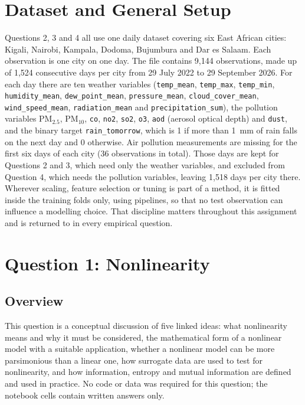 \documentclass[conference]{IEEEtran}
\begin{document}
\section{Dataset and General Setup}
Questions 2, 3 and 4 all use one daily dataset covering six East African cities: Kigali, Nairobi, Kampala, Dodoma, Bujumbura and Dar es Salaam. Each observation is one city on one day. The file contains 9{,}144 observations, made up of 1{,}524 consecutive days per city from 29 July 2022 to 29 September 2026. For each day there are ten weather variables (\texttt{temp\_mean}, \texttt{temp\_max}, \texttt{temp\_min}, \texttt{humidity\_mean}, \texttt{dew\_point\_mean}, \texttt{pressure\_mean}, \texttt{cloud\_cover\_mean}, \texttt{wind\_speed\_mean}, \texttt{radiation\_mean} and \texttt{precipitation\_sum}), the pollution variables PM$_{2.5}$, PM$_{10}$, \texttt{co}, \texttt{no2}, \texttt{so2}, \texttt{o3}, \texttt{aod} (aerosol optical depth) and \texttt{dust}, and the binary target \texttt{rain\_tomorrow}, which is 1 if more than 1~mm of rain falls on the next day and 0 otherwise. Air pollution measurements are missing for the first six days of each city (36 observations in total). Those days are kept for Questions 2 and 3, which need only the weather variables, and excluded from Question 4, which needs the pollution variables, leaving 1{,}518 days per city there. Wherever scaling, feature selection or tuning is part of a method, it is fitted inside the training folds only, using pipelines, so that no test observation can influence a modelling choice. That discipline matters throughout this assignment and is returned to in every empirical question.

\section{Question 1: Nonlinearity}
\subsection{Overview}
This question is a conceptual discussion of five linked ideas: what nonlinearity means and why it must be considered, the mathematical form of a nonlinear model with a suitable application, whether a nonlinear model can be more parsimonious than a linear one, how surrogate data are used to test for nonlinearity, and how information, entropy and mutual information are defined and used in practice. No code or data was required for this question; the notebook cells contain written answers only.
\end{document}
